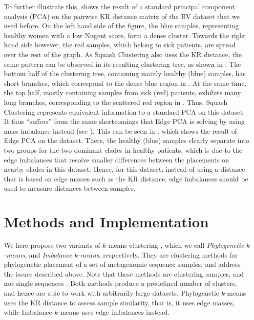 To further illustrate this,  shows
the result of a standard principal component analysis (PCA) \cite{Pearson1901,Jolliffe2002}
on the pairwise KR distance matrix of the \acf{BV} dataset \cite{Srinivasan2012} that we used before.
On the left hand side of the figure, the blue samples,
representing healthy women with a low Nugent score, form a dense cluster.
Towards the right hand side however, the red samples, which belong to sick patients, are spread over the rest of the graph.
As Squash Clustering also uses the KR distance, the same pattern can be observed in its resulting clustering tree,
as shown in :
The bottom half of the clustering tree, containing mainly healthy (blue) samples, has short branches,
which correspond to the dense blue region in .
At the same time, the top half, mostly containing samples from sick (red) patients, exhibits many long branches,
corresponding to the scattered red region in .
Thus, Squash Clustering represents equivalent information to a standard PCA on this dataset.
It thus ``suffers'' from the same shortcomings that Edge PCA is solving by using mass imbalance instead
(see ).
This can be seen in , which shows the result of Edge PCA on the dataset.
There, the healthy (blue) samples clearly separate
into two groups for the two dominant  clades in healthy patients,
which is due to the edge imbalances that resolve smaller differences between the placements on nearby clades in this dataset.
Hence, for this dataset, instead of using a distance that is based on edge masses such as the KR distance,
edge imbalances should be used to measure distances between samples.


\section{Methods and Implementation}
\label{ch:Clustering:sec:Methods}

We here propose two variants of $k$-means clustering \cite{Steinhaus1956,Macqueen1967},
which we call \emph{Phylogenetic $k$-means}, and \emph{Imbalance $k$-means}, respectively.
They are clustering methods for phylogenetic placement of a set of metagenomic sequence samples,
and address the issues described above.
Note that these methods are clustering samples, and not single sequences \cite{Kelley2010}.
Both methods produce a predefined number of clusters, and hence are able to work with arbitrarily large datasets.
Phylogenetic $k$-means uses the KR distance to assess sample similarity, that is, it uses edge masses,
while Imbalance $k$-means uses edge imbalances instead.

